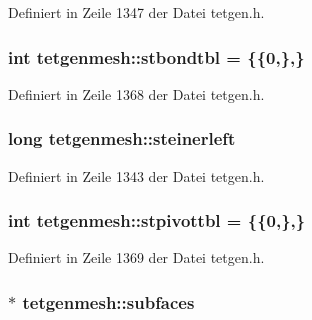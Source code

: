 Definiert in Zeile 1347 der Datei tetgen.\-h.

\hypertarget{classtetgenmesh_a8c25d3648eac238fe5cd43ed4b06c040}{
\subsubsection[{stbondtbl}]{\setlength{\rightskip}{0pt plus 5cm}int tetgenmesh\-::stbondtbl = \{\{0,\},\}\hspace{0.3cm}{\ttfamily [static]}}}\label{classtetgenmesh_a8c25d3648eac238fe5cd43ed4b06c040}


Definiert in Zeile 1368 der Datei tetgen.\-h.

\hypertarget{classtetgenmesh_a75d135951ad8b417cab56a9ae3be44c8}{
\subsubsection[{steinerleft}]{\setlength{\rightskip}{0pt plus 5cm}long tetgenmesh\-::steinerleft}}\label{classtetgenmesh_a75d135951ad8b417cab56a9ae3be44c8}


Definiert in Zeile 1343 der Datei tetgen.\-h.

\hypertarget{classtetgenmesh_ab90b809e43493efe2b4132ef5b056dba}{
\subsubsection[{stpivottbl}]{\setlength{\rightskip}{0pt plus 5cm}int tetgenmesh\-::stpivottbl = \{\{0,\},\}\hspace{0.3cm}{\ttfamily [static]}}}\label{classtetgenmesh_ab90b809e43493efe2b4132ef5b056dba}


Definiert in Zeile 1369 der Datei tetgen.\-h.

\hypertarget{classtetgenmesh_af637b87538d6c06fdbb47b24f940a18e}{
\subsubsection[{subfaces}]{ $\ast$ tetgenmesh\-::subfaces}}\label{classtetgenmesh_af637b87538d6c06fdbb47b24f940a18e}


